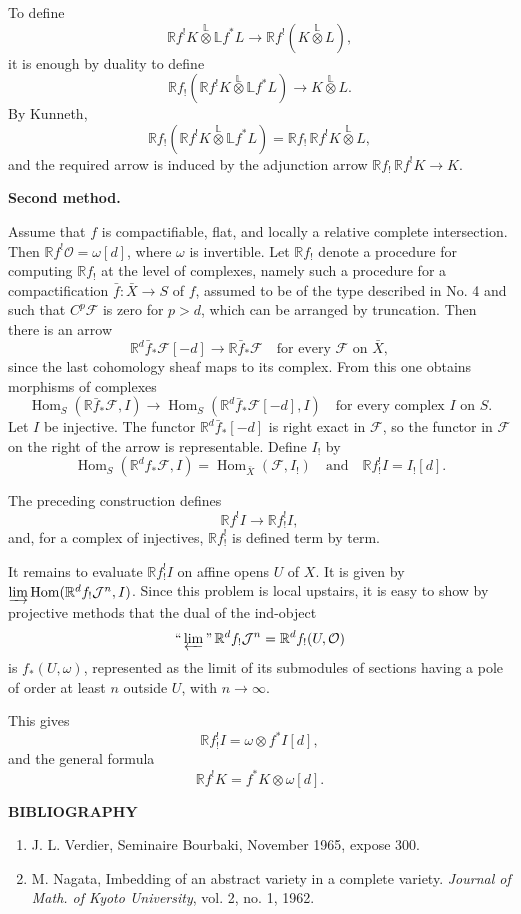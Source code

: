 \documentclass[12pt]{amsart}
\theoremstyle{plain}
\theoremstyle{definition}
\DeclareMathOperator{\Hom}{Hom}
\newcommand{\cF}{\mathcal{F}}
\newcommand{\cJ}{\mathcal{J}}
\newcommand{\cO}{\mathcal{O}}
\newcommand{\bR}{\mathbb{R}}
\newcommand{\bL}{\mathbb{L}}
\begin{document}
To define
\[
\bR f^!K\overset{\mathbb L}{\otimes}\bL f^*L\to\bR f^!(K\overset{\mathbb L}{\otimes}L),
\]
it is enough by duality to define
\[
\bR f_!(\bR f^!K\overset{\mathbb L}{\otimes}\bL f^*L)\to K\overset{\mathbb L}{\otimes}L.
\]
By Kunneth,
\[
\bR f_!(\bR f^!K\overset{\mathbb L}{\otimes}\bL f^*L)=\bR f_!\,\bR f^!K\overset{\mathbb L}{\otimes}L,
\]
and the required arrow is induced by the adjunction arrow $\bR f_!\,\bR f^!K\to K$.

\textbf{Second method.}

Assume that $f$ is compactifiable, flat, and locally a relative complete intersection. Then $\bR f^!\cO=\omega[d]$, where $\omega$ is invertible. Let $\bR f_!$ denote a procedure for computing $\bR f_!$ at the level of complexes, namely such a procedure for a compactification $\bar f:\bar X\to S$ of $f$, assumed to be of the type described in No. 4 and such that $C^p\cF$ is zero for $p>d$, which can be arranged by truncation. Then there is an arrow
\[
\bR^d\bar f_*\cF[-d]\to\bR\bar f_*\cF\quad\text{for every }\cF\text{ on }\bar X,
\]
since the last cohomology sheaf maps to its complex. From this one obtains morphisms of complexes
\[
\Hom_S(\bR\bar f_*\cF,I)\to\Hom_S(\bR^d\bar f_*\cF[-d],I)
\quad\text{for every complex }I\text{ on }S.
\]
Let $I$ be injective. The functor $\bR^d\bar f_*[-d]$ is right exact in $\cF$, so the functor in $\cF$ on the right of the arrow is representable. Define $I_!$ by
\[
\Hom_S(\bR^df_*\cF,I)=\Hom_{\bar X}(\cF,I_!)\quad\text{and}\quad \bR f^!_!I=I_![d].
\]

The preceding construction defines
\[
\bR f^!I\to\bR f^!_!I,
\]
and, for a complex of injectives, $\bR f^!_!$ is defined term by term.

It remains to evaluate $\bR f^!_!I$ on affine opens $U$ of $X$. It is given by $\varinjlim\Hom(\bR^df_!\cJ^n,I)$. Since this problem is local upstairs, it is easy to show by projective methods that the dual of the ind-object
\[
\text{``}\varprojlim\text{''}\,\bR^df_!\cJ^n=\bR^df_!(U,\cO)
\]
is $f_*(U,\omega)$, represented as the limit of its submodules of sections having a pole of order at least $n$ outside $U$, with $n\to\infty$.

This gives
\[
\bR f^!_!I=\omega\otimes f^*I[d],
\]
and the general formula
\[
\bR f^!K=f^*K\otimes\omega[d].
\]

\bigskip

\begin{center}
\textbf{BIBLIOGRAPHY}
\end{center}

\begin{enumerate}
\item[{[1]}] J. L. Verdier, Seminaire Bourbaki, November 1965, expose 300.
\item[{[2]}] M. Nagata, Imbedding of an abstract variety in a complete variety. \textit{Journal of Math. of Kyoto University}, vol. 2, no. 1, 1962.
\end{enumerate}
\end{document}
